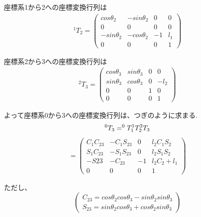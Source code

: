 \documentclass[a4j]{jarticle}			%
\begin{document}
\begin{multicols}{2}
座標系1から2への座標変換行列は
\begin{equation*}
	\begin{array}{cc}
		^{1}T_{2}=
		\left( 
			\begin{array}{cccc}
				cos\theta_2 & -sin\theta_2 & 0 & 0 \\
				0 & 0& 0 & 0 \\
				-sin\theta_2 & -cos\theta_2 & -1 & l_1 \\
				0 & 0 & 0 & 1 
			\end{array}
		\right)
	\end{array}
\end{equation*}


座標系2から3への座標変換行列は
\begin{equation*}
	\begin{array}{cc}
		^{2}T_{3}=
		\left( 
			\begin{array}{cccc}
				cos\theta_3 & sin\theta_3 & 0 & 0 \\
				sin\theta_3 & cos\theta_3 & 0 & -l_2 \\
				0 & 0 & 1 & 0 \\
				0 & 0 & 0 & 1 
			\end{array}
		\right)
	\end{array}
\end{equation*}

よって座標系0から3への座標変換行列は、つぎのように求まる. 
$$
	^{0}T_{3}=^{0}T_{1} ^{1}T_{2} ^{2}T_{3} \\
$$
\begin{equation*}
	\begin{array}{cc}
		=
		\left( 
			\begin{array}{cccc}
				C_1C_{23} & -C_1S_{23} & 0 & l_2C_1S_2 \\
				S_1C_{23} & -S_1S_{23} & 0 & l_2S_1S_2 \\
				-S{23} & -C_{23} & -1 & l_2C_2 + l_1 \\
				0 & 0 & 0 & 1 
			\end{array}
		\right)
	\end{array}
\end{equation*}

ただし、
\begin{equation*}
	\left(
	\begin{split}
		C_{23} = cos\theta_2cos\theta_3-sin\theta_2sin\theta_3\\
		S_{23} = sin\theta_2cos\theta_3+cos\theta_2sin\theta_3	
	\end{split}
	\right)
\end{equation*}



\end{multicols}
\end{document}
